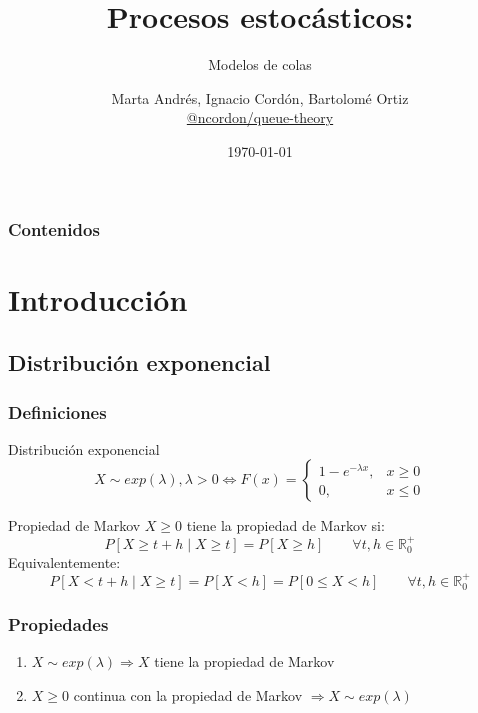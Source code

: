 \documentclass[8pt]{beamer}
\title[]{Procesos estocásticos: } %
\subtitle[]{Modelos de colas}
\author[Marta Andrés, Ignacio Cordón, Bartolomé Ortiz] %
{\texorpdfstring{
      \centering
      Marta Andrés, Ignacio Cordón, Bartolomé Ortiz\\
      \href{http://www.github.com/ncordon/queue-theory}{@ncordon/queue-theory}
}{Marta Andrés, Ignacio Cordón, Bartolomé Ortiz}}
\institute[UGR] %
{
  Universidad de Granada \\ %
  \medskip
}
\date{\today} %
\begin{document}
\begin{frame}
\titlepage %
\end{frame}

\begin{frame}
  \frametitle{Contenidos} %
  \tableofcontents
\end{frame}




  \section{Introducción}
  \subsection{Distribución exponencial}
  \begin{frame}\frametitle{Definiciones}
    \begin{block}{Distribución exponencial}
      \[X \sim exp(\lambda),\lambda > 0 \Leftrightarrow F(x) = \left\{\begin{array}{ll}
      1- e^{-\lambda x} ,& x\ge 0 \\
      0 ,& x\le 0
      \end{array}\right.\]
    \end{block}

    \begin{block}{Propiedad de Markov}
      $X \ge 0$ tiene la propiedad de Markov si:
      \[P[X \ge t+h \mid X \ge t] = P[X \ge h] \qquad \forall t,h \in \mathbb{R}_0^{+}\]
      Equivalentemente:
      \[P[X < t+h \mid X \ge t] = P[X < h] = P[ 0 \le X < h] \qquad \forall t,h \in \mathbb{R}_0^{+}\]
    \end{block}
  \end{frame}
  \begin{frame}\frametitle{Propiedades}
    \begin{enumerate}
    \item
      $X \sim exp(\lambda) \Rightarrow X$ tiene la propiedad de Markov
    \item
      $X\ge 0$ continua con la propiedad de Markov $\Rightarrow X \sim exp(\lambda)$
    \end{enumerate}
  \end{frame}
\end{document}

